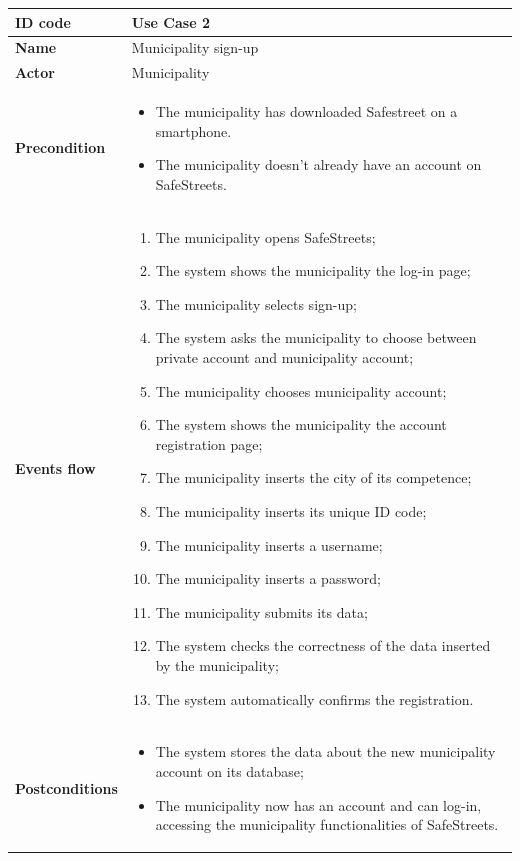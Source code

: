 \documentclass[titlepage]{article}
\begin{document}
\begin{longtable}{| p{3 cm} | p{10 cm} |} 
\hline

\textbf{ID code} & Use Case 2 \\ \hline
\textbf{Name} & Municipality sign-up \\ \hline
\textbf{Actor} & Municipality \\ \hline
\textbf{Precondition} & 
\begin{itemize}
\item The municipality has downloaded Safestreet on a smartphone.
\item The municipality doesn't already have an account on SafeStreets.
\end{itemize} \\ \hline
\textbf{Events flow} &
\begin{enumerate}
\item The municipality opens SafeStreets;
\item The system shows the municipality the log-in page;
\item The municipality selects sign-up;
\item The system asks the municipality to choose between private account and municipality account;
\item The municipality chooses municipality account;
\item The system shows the municipality the account registration page;
\item The municipality inserts the city of its competence;
\item The municipality inserts its unique ID code;
\item The municipality inserts a username;
\item The municipality inserts a password;
\item The municipality submits its data;
\item The system checks the correctness of the data inserted by the municipality;
\item The system automatically confirms the registration.
\end{enumerate} \\ \hline
\textbf{Postconditions} &
\begin{itemize}
\item The system stores the data about the new municipality account on its database;
\item The municipality now has an account and can log-in, accessing the municipality functionalities of SafeStreets.
\end{itemize} \\ \hline



\end{longtable}
\end{document}
